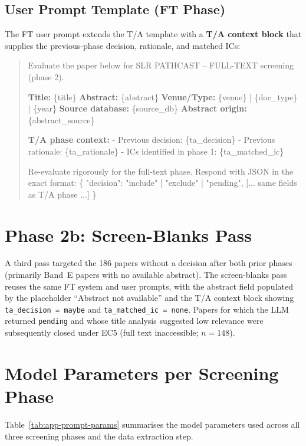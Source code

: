 \subsection*{User Prompt Template (FT Phase)}

The FT user prompt extends the T/A template with a \textbf{T/A context block}
that supplies the previous-phase decision, rationale, and matched ICs:

\begin{quote}
\small\ttfamily
Evaluate the paper below for SLR PATHCAST -- FULL-TEXT screening (phase 2).

\textbf{Title:} \{title\}
\textbf{Abstract:} \{abstract\}
\textbf{Venue/Type:} \{venue\} | \{doc\_type\} | \{year\}
\textbf{Source database:} \{source\_db\}
\textbf{Abstract origin:} \{abstract\_source\}

\textbf{T/A phase context:}
  - Previous decision: \{ta\_decision\}
  - Previous rationale: \{ta\_rationale\}
  - ICs identified in phase 1: \{ta\_matched\_ic\}

Re-evaluate rigorously for the full-text phase.
Respond with JSON in the exact format:
\{
  "decision": "include" | "exclude" | "pending",
  [... same fields as T/A phase ...]
\}
\end{quote}

\section{Phase 2b: Screen-Blanks Pass}
\label{app:slr-blanks-prompt}

A third pass targeted the 186 papers without a decision after both prior
phases (primarily Band~E papers with no available abstract). The screen-blanks
pass reuses the same FT system and user prompts, with the abstract field
populated by the placeholder ``Abstract not available'' and the T/A context
block showing \texttt{ta\_decision~=~maybe} and
\texttt{ta\_matched\_ic~=~none}. Papers for which the LLM returned
\texttt{pending} and whose title analysis suggested low relevance were
subsequently closed under EC5 (full text inaccessible; $n = 148$).

\section{Model Parameters per Screening Phase}
\label{app:slr-prompt-params}

Table~\ref{tab:app-prompt-params} summarises the model parameters used
across all three screening phases and the data extraction step.


